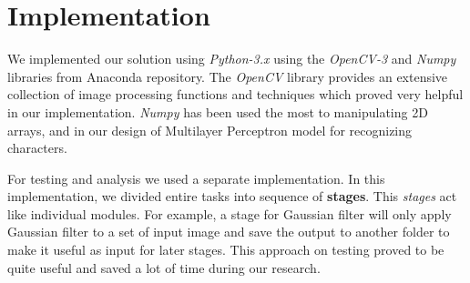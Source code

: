 \documentclass{standalone}
\begin{document}
\section{Implementation}
We implemented our solution using {\it Python-3.x} using the {\it OpenCV-3} and {\it Numpy} libraries from Anaconda repository. 
The {\it OpenCV} library provides an extensive collection of image processing functions and techniques which proved very helpful in our implementation. 
{\it Numpy} has been used the most to manipulating 2D arrays, and in our design of Multilayer Perceptron model for recognizing characters.

For testing and analysis we used a separate implementation. In this implementation, we divided entire tasks into sequence of {\bf stages}. This {\it stages} act like individual modules. For example, a stage for Gaussian filter will only apply Gaussian filter to a set of input image and save the output to another folder to make it useful as input for later stages. This approach on testing proved to be quite useful and saved a lot of time during our research.
\end{document}
